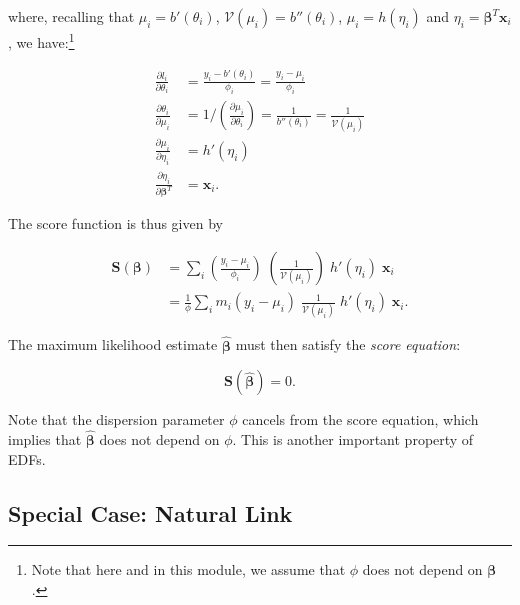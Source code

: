\documentclass[
  12pt,
]{book}
\begin{document}
where, recalling that \(\mu_i = b'(\theta_i)\), \(\mathcal{V}(\mu_{i}) = b''(\theta_{i})\), \(\mu_i = h(\eta_i)\) and \(\eta_i = \boldsymbol{\beta}^T\boldsymbol{x}_i\), we have:\footnote{Note that here and in this module, we assume that \(\phi\) does not depend on \(\boldsymbol{\beta}\).}

\begin{align}
  \frac{\partial l_{i} }{\partial \theta_{i}}
    & = \frac{y_{i} - b'(\theta_{i})}{\phi_{i}}
      = \frac{y_{i} - \mu_{i}}{\phi_{i}} \\
  \frac{\partial \theta_{i}}{\partial \mu_{i}}
    & = 1 / \left( \frac{\partial \mu_{i}}{\partial \theta_{i}} \right)
      = \frac{1}{b''(\theta_{i})}
      = \frac{1}{\mathcal{V}(\mu_{i})}
      \label{eq:dthetadmu} \\
  \frac{\partial \mu_{i}}{\partial \eta_{i}}
    & = h'(\eta_{i})
      \label{eq:dmudeta} \\
  \frac{\partial \eta_{i}}{\partial \boldsymbol{\beta}^{T}}
    & = \boldsymbol{x}_{i}.
\end{align}

The score function is thus given by

\begin{align}
  \boldsymbol{S}(\boldsymbol{\beta})
  & = \sum_{i} \left(\frac{y_{i} - \mu_{i}}{\phi_{i}} \right) \;
               \left(\frac{1}{\mathcal{V}(\mu_{i})} \right) \;
               h'(\eta_{i}) \;\boldsymbol{x}_{i} \\
  & = \frac{1}{\phi} \sum_{i} m_{i}(y_{i} - \mu_{i}) \;
                              \frac{1}{\mathcal{V}(\mu_{i})} \;
                              h'(\eta_{i}) \;\boldsymbol{x}_{i}.
  \label{eq:scorefunction2}
\end{align}

The maximum likelihood estimate \(\hat{\boldsymbol{\beta}}\) must then satisfy the \emph{score equation}:

\begin{equation}
  \boldsymbol{S}(\hat{\boldsymbol{\beta}}) = 0.
  \label{eq:scoreequation}
\end{equation}

Note that the dispersion parameter \(\phi\) cancels from the score equation, which implies that \(\hat{\boldsymbol{\beta}}\) does not depend on \(\phi\). This is another important property of EDFs.

\subsection{Special Case: Natural Link}\label{special-case-natural-link}
\end{document}
